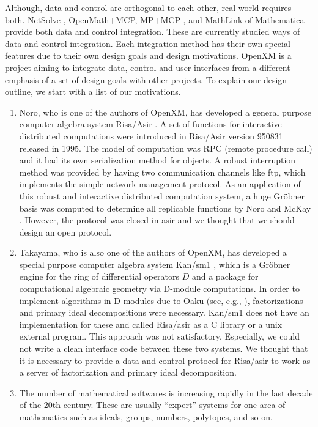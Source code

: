 Although, data and control are orthogonal to each other,
real world requires both.
NetSolve \cite{netsolve}, OpenMath$+$MCP, MP$+$MCP \cite{iamc},
and MathLink of Mathematica provide both data and control integration.
These are currently studied ways of data and control integration.
Each integration method has their own special features due to their
own design goals and design motivations.
OpenXM is a project aiming to integrate data, control and user interfaces
from a different emphasis of a set of design goals with other projects.
To explain our design outline, we start with a list of
our motivations.
\begin{enumerate}
\item Noro,  who is one of the authors of OpenXM, has developed a general
purpose computer algebra system Risa/Asir \cite{asir}.
A set of functions for interactive distributed computations were introduced
in Risa/Asir version 950831 released in 1995.
The model of computation was RPC (remote procedure call)
and it had its own serialization method for objects.
A robust interruption method was provided by having two communication channels
like ftp, which implements the simple network management protocol.
As an application of this robust and interactive distributed computation
system, 
a huge Gr\"obner basis was computed
to determine all replicable functions by Noro and McKay \cite{noro-mckay}.
However, the protocol was closed in asir and we thought that we should
design an open protocol.
\item Takayama, who is also one of the authors of OpenXM, has developed
a special purpose computer algebra system Kan/sm1 \cite{kan},
which is a Gr\"obner engine for the ring of differential operators $D$ and
a package for computational algebraic geometry via D-module computations.
In order to implement algorithms in D-modules due to Oaku 
(see, e.g., \cite{sst-book}),
factorizations and primary ideal decompositions were necessary.
Kan/sm1 does not have an implementation for these and called
Risa/asir as a C library or a unix external program.
This approach was not satisfactory.
Especially, we could not write a clean interface code between these
two systems.
We thought that it is necessary to provide a data and control protocol
for Risa/asir to work as a server of factorization and primary ideal
decomposition.
\item The number of mathematical softwares is increasing rapidly in the last
decade of the 20th century.
These are usually ``expert'' systems for one area of mathematics
such as ideals, groups, numbers, polytopes, and so on.

\end{enumerate}
